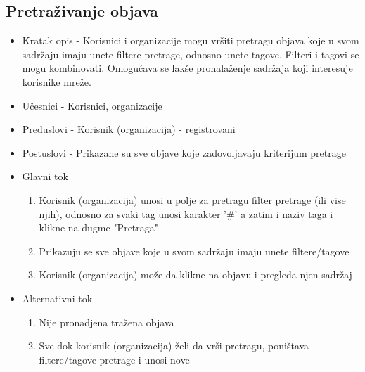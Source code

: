 \subsection{Pretraživanje objava}
\begin{itemize}
	\item Kratak opis - Korisnici i organizacije mogu vršiti pretragu objava koje u svom sadržaju imaju unete filtere pretrage, odnosno unete tagove. Filteri i tagovi se mogu kombinovati. Omogućava se lakše pronalaženje sadržaja koji interesuje korisnike mreže.
	\item Učesnici - Korisnici, organizacije
	\item Preduslovi - Korisnik (organizacija) - registrovani
	\item Postuslovi - Prikazane su sve objave koje zadovoljavaju kriterijum pretrage 
	\item Glavni tok
	\begin{enumerate}
		\item Korisnik (organizacija) unosi u polje za pretragu filter pretrage (ili vise njih), odnosno za svaki tag unosi karakter '#' a zatim i naziv taga i klikne na dugme "Pretraga"
		\item Prikazuju se sve objave koje u svom sadržaju imaju unete filtere/tagove
		\item Korisnik (organizacija) može da klikne na objavu i pregleda njen sadržaj
	\end{enumerate}
	\item Alternativni tok
	\begin{enumerate}
		\item Nije pronadjena tražena objava
		\item Sve dok korisnik (organizacija) želi da vrši pretragu, poništava filtere/tagove pretrage i unosi nove 
	\end{enumerate}
\end{itemize}


